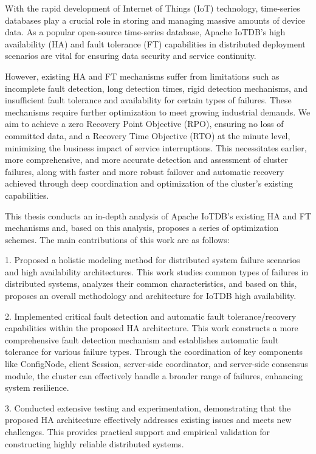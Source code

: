 \begin{abstract*}
With the rapid development of Internet of Things (IoT) technology, time-series databases play a crucial role in storing and managing massive amounts of device data. As a popular open-source time-series database, Apache IoTDB's high availability (HA) and fault tolerance (FT) capabilities in distributed deployment scenarios are vital for ensuring data security and service continuity.

However, existing HA and FT mechanisms suffer from limitations such as incomplete fault detection, long detection times, rigid detection mechanisms, and insufficient fault tolerance and availability for certain types of failures. These mechanisms require further optimization to meet growing industrial demands. We aim to achieve a zero Recovery Point Objective (RPO), ensuring no loss of committed data, and a Recovery Time Objective (RTO) at the minute level, minimizing the business impact of service interruptions. This necessitates earlier, more comprehensive, and more accurate detection and assessment of cluster failures, along with faster and more robust failover and automatic recovery achieved through deep coordination and optimization of the cluster's existing capabilities.

This thesis conducts an in-depth analysis of Apache IoTDB's existing HA and FT mechanisms and, based on this analysis, proposes a series of optimization schemes. The main contributions of this work are as follows:

1. Proposed a holistic modeling method for distributed system failure scenarios and high availability architectures. This work studies common types of failures in distributed systems, analyzes their common characteristics, and based on this, proposes an overall methodology and architecture for IoTDB high availability.

2. Implemented critical fault detection and automatic fault tolerance/recovery capabilities within the proposed HA architecture. This work constructs a more comprehensive fault detection mechanism and establishes automatic fault tolerance for various failure types. Through the coordination of key components like ConfigNode, client Session, server-side coordinator, and server-side consensus module, the cluster can effectively handle a broader range of failures, enhancing system resilience.

3. Conducted extensive testing and experimentation, demonstrating that the proposed HA architecture effectively addresses existing issues and meets new challenges. This provides practical support and empirical validation for constructing highly reliable distributed systems.


\end{abstract*}
